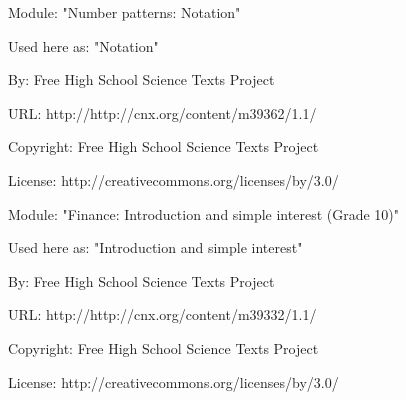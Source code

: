       \par\vspace{9pt}\noindent\begin{minipage}{\textwidth}
      Module: "Number patterns: Notation" \par\nopagebreak\noindent
      Used here as: "Notation" \par\nopagebreak\noindent
        By: Free High School Science Texts Project\par\nopagebreak\noindent
      URL: http://http://cnx.org/content/m39362/1.1/\par\nopagebreak\noindent
      \par\nopagebreak\noindent
      Copyright: Free High School Science Texts Project\par\nopagebreak\noindent
      License:  http://creativecommons.org/licenses/by/3.0/\par\nopagebreak\noindent
      \par\end{minipage}
      \par\vspace{9pt}\noindent\begin{minipage}{\textwidth}
      Module: "Finance: Introduction and simple interest (Grade 10)" \par\nopagebreak\noindent
      Used here as: "Introduction and simple interest" \par\nopagebreak\noindent
        By: Free High School Science Texts Project\par\nopagebreak\noindent
      URL: http://http://cnx.org/content/m39332/1.1/\par\nopagebreak\noindent
      \par\nopagebreak\noindent
      Copyright: Free High School Science Texts Project\par\nopagebreak\noindent
      License:  http://creativecommons.org/licenses/by/3.0/\par\nopagebreak\noindent
      \par\end{minipage}
